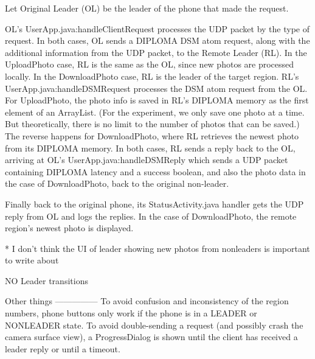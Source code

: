 Let Original Leader (OL) be the leader of the phone that made the request. 

OL’s UserApp.java:handleClientRequest processes the UDP packet by the type of request. In both cases, OL sends a DIPLOMA DSM atom request, along with the additional information from the UDP packet, to the Remote Leader (RL). In the UploadPhoto case, RL is the same as the OL, since new photos are processed locally. In the DownloadPhoto case, RL is the leader of the target region. RL’s UserApp.java:handleDSMRequest processes the DSM atom request from the OL. For UploadPhoto, the photo info is saved in RL’s DIPLOMA memory as the first element of an ArrayList. (For the experiment, we only save one photo at a time. But theoretically, there is no limit to the number of photos that can be saved.) The reverse happens for DownloadPhoto, where RL retrieves the newest photo from its DIPLOMA memory.  In both cases, RL sends a reply back to the OL, arriving at OL’s UserApp.java:handleDSMReply which sends a UDP packet containing DIPLOMA latency and a success boolean, and also the photo data in the case of DownloadPhoto, back to the original non-leader.

Finally back to the original phone, its StatusActivity.java handler gets the UDP reply from OL and logs the replies. In the case of DownloadPhoto, the remote region’s newest photo is displayed.

* I don’t think the UI of leader showing new photos from nonleaders is important to write about

NO Leader transitions

 Other things
---------------
To avoid confusion and inconsistency of the region numbers, phone buttons only work if the phone is in a LEADER or NONLEADER state.  To avoid double-sending a request (and possibly crash the camera surface view), a ProgressDialog is shown until the client has received a leader reply or until a timeout. 
